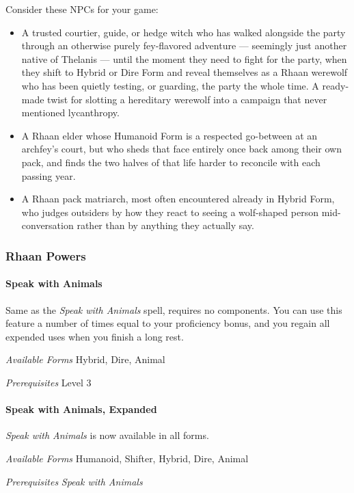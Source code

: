 \documentclass[twocolumn]{dndbook}
\begin{document}
Consider these NPCs for your game:
\begin{itemize}
    \item A trusted courtier, guide, or hedge witch who has walked alongside the party through an otherwise purely fey-flavored adventure --- seemingly just another native of Thelanis --- until the moment they need to fight for the party, when they shift to Hybrid or Dire Form and reveal themselves as a Rhaan werewolf who has been quietly testing, or guarding, the party the whole time. A ready-made twist for slotting a hereditary werewolf into a campaign that never mentioned lycanthropy.
    \item A Rhaan elder whose Humanoid Form is a respected go-between at an archfey's court, but who sheds that face entirely once back among their own pack, and finds the two halves of that life harder to reconcile with each passing year.
    \item A Rhaan pack matriarch, most often encountered already in Hybrid Form, who judges outsiders by how they react to seeing a wolf-shaped person mid-conversation rather than by anything they actually say.
\end{itemize}


\subsubsection{Rhaan Powers}

\paragraph*{Speak with Animals}
Same as the \emph{Speak with Animals} spell, requires no components.
You can use this feature a number of times equal to your proficiency bonus, and you regain all expended uses when you finish a long rest.\par
\emph{Available Forms} Hybrid, Dire, Animal\par
\emph{Prerequisites} Level 3\par

\paragraph*{Speak with Animals, Expanded}
\emph{Speak with Animals} is now available in all forms.\par
\emph{Available Forms} Humanoid, Shifter, Hybrid, Dire, Animal\par
\emph{Prerequisites} \emph{Speak with Animals}\par
\end{document}
